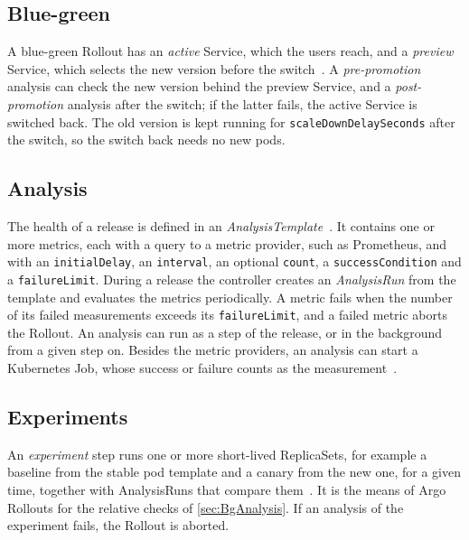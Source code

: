 \subsection{Blue-green}
\label{sec:ArgoRolloutsBlueGreen}
A blue-green Rollout has an \emph{active} Service, which the users reach, and a \emph{preview} Service, which selects the new version before the switch~\cite{ArgoRolloutsBlueGreen}. A \emph{pre-promotion} analysis can check the new version behind the preview Service, and a \emph{post-promotion} analysis after the switch; if the latter fails, the active Service is switched back. The old version is kept running for \texttt{scaleDownDelaySeconds} after the switch, so the switch back needs no new pods.

\subsection{Analysis}
\label{sec:ArgoRolloutsAnalysis}
The health of a release is defined in an \emph{AnalysisTemplate}~\cite{ArgoRolloutsAnalysis}. It contains one or more metrics, each with a query to a metric provider, such as Prometheus, and with an \texttt{initialDelay}, an \texttt{interval}, an optional \texttt{count}, a \texttt{successCondition} and a \texttt{failureLimit}. During a release the controller creates an \emph{AnalysisRun} from the template and evaluates the metrics periodically. A metric fails when the number of its failed measurements exceeds its \texttt{failureLimit}, and a failed metric aborts the Rollout. An analysis can run as a step of the release, or in the background from a given step on. Besides the metric providers, an analysis can start a Kubernetes Job, whose success or failure counts as the measurement~\cite{ArgoRolloutsJob}.

\subsection{Experiments}
\label{sec:ArgoRolloutsExperiments}
An \emph{experiment} step runs one or more short-lived ReplicaSets, for example a baseline from the stable pod template and a canary from the new one, for a given time, together with AnalysisRuns that compare them~\cite{ArgoRolloutsExperiment}. It is the means of Argo Rollouts for the relative checks of \autoref{sec:BgAnalysis}. If an analysis of the experiment fails, the Rollout is aborted.

